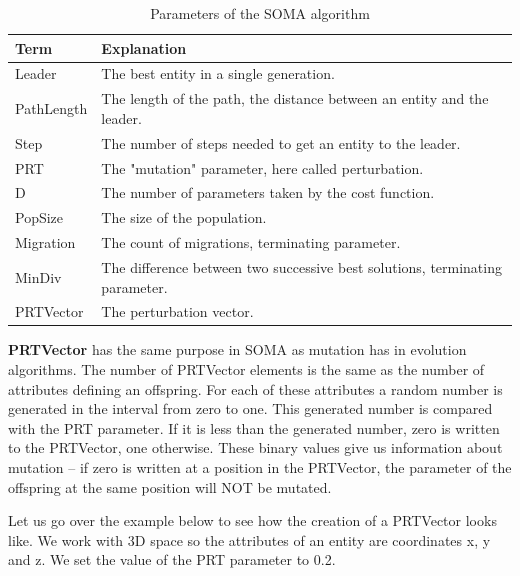 \documentclass[review]{elsarticle}
\begin{document}
\begin{table}[h]
	\centering
	\caption{Parameters of the SOMA algorithm}
	\label{table:somapar}
	\begin{tabular}{| l | p{11cm} |}
		\hline
		Term		& 	Explanation \\
		\hline
		Leader		        &	The best entity in a single generation. \\
		PathLength    &	The length of the path, the distance between an entity and the leader. \\
		Step		        &	The number of steps needed to get an entity to the leader. \\
		PRT		        &	The "mutation" parameter, here called perturbation. \\
		D		        &	The number of parameters taken by the cost function. \\
		PopSize	        &	The size of the population. \\
		Migration        &	The count of migrations, terminating parameter. \\
		MinDiv            &	The difference between two successive best solutions, terminating parameter. \\
		PRTVector     &	The perturbation vector. \\
		\hline
	\end{tabular}
\end{table}
\vspace{10pt}



\textbf{PRTVector} has the same purpose in SOMA as mutation has in evolution algorithms. The number of PRTVector elements is the same as the number of attributes defining an offspring. For each of these attributes a random number is generated in the interval from zero to one. This generated number is compared with the PRT parameter. If it is less than the generated number, zero is written to the PRTVector, one otherwise. These binary values give us information about mutation -- if zero is written at a position in the PRTVector, the parameter of the offspring at the same position will NOT be mutated. 

Let us go over the example below to see how the creation of a PRTVector looks like. We work with 3D space so the attributes of an entity are coordinates x, y and z. We set the value of the PRT parameter to 0.2.
\end{document}
